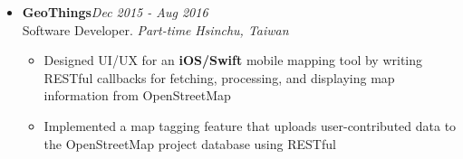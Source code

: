 \begin{itemize}[leftmargin=0pt, label={}]
\item{
{\sectionheading\large{\textbf{GeoThings}}}\hfill {\sectionheading\small{\textit{Dec 2015 - Aug 2016}}}\\
{\sectionheading\small{Software Developer. \textit{Part-time}}}\hfill
{\sectionheading\small{\textit{Hsinchu, Taiwan}}}

    \vspace{-6pt}
    \begin{itemize}[label=\textbullet, leftmargin=*, noitemsep]%
        \item{Designed UI/UX for an \textbf{iOS/Swift} mobile mapping tool by writing RESTful callbacks for fetching, processing, and displaying map information from OpenStreetMap}
        \item{Implemented a map tagging feature that uploads user-contributed data to the OpenStreetMap project database using RESTful}
    \end{itemize}
}
\end{itemize}

